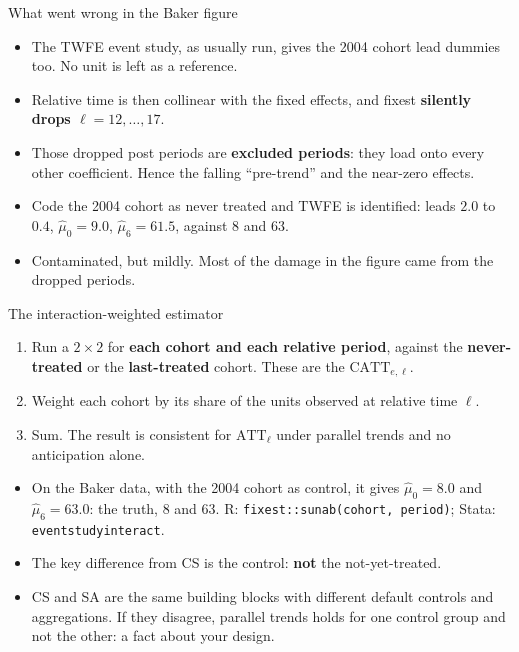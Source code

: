 \documentclass[
  11pt,
  ignorenonframetext,
  aspectratio=169,
]{beamer}
\providecommand{\tightlist}{%
  \setlength{\itemsep}{0pt}\setlength{\parskip}{0pt}}
\begin{document}
\begin{frame}{What went wrong in the Baker figure}
\protect{}\label{what-went-wrong-in-the-baker-figure}
\begin{itemize}
\tightlist
\item
  The TWFE event study, as usually run, gives the 2004 cohort lead
  dummies too. No unit is left as a reference.
\item
  Relative time is then collinear with the fixed effects, and fixest
  \textbf{silently drops \(\ell = 12, \dots, 17\)}.
\item
  Those dropped post periods are \textbf{excluded periods}: they load
  onto every other coefficient. Hence the falling ``pre-trend'' and the
  near-zero effects.
\end{itemize}

\vspace{0.4em}

\begin{itemize}
\tightlist
\item
  Code the 2004 cohort as never treated and TWFE is identified: leads
  \(2.0\) to \(0.4\), \(\hat\mu_0 = 9.0\), \(\hat\mu_{6} = 61.5\),
  against \(8\) and \(63\).
\item
  Contaminated, but mildly. Most of the damage in the figure came from
  the dropped periods.
\end{itemize}
\end{frame}

\begin{frame}[fragile]{The interaction-weighted estimator}
\protect{}\label{the-interaction-weighted-estimator}
\begin{enumerate}
\tightlist
\item
  Run a \(2 \times 2\) for \textbf{each cohort and each relative
  period}, against the \textbf{never-treated} or the
  \textbf{last-treated} cohort. These are the \(\text{CATT}_{e,\ell}\).
\item
  Weight each cohort by its share of the units observed at relative time
  \(\ell\).
\item
  Sum. The result is consistent for \(\text{ATT}_\ell\) under parallel
  trends and no anticipation alone.
\end{enumerate}

\vspace{0.3em}

\begin{itemize}
\tightlist
\item
  On the Baker data, with the 2004 cohort as control, it gives
  \(\hat\mu_0 = 8.0\) and \(\hat\mu_6 = 63.0\): the truth, \(8\) and
  \(63\). R: \texttt{fixest::sunab(cohort,\ period)}; Stata:
  \texttt{eventstudyinteract}.
\item
  The key difference from CS is the control: \textbf{not} the
  not-yet-treated.
\item
  CS and SA are the same building blocks with different default controls
  and aggregations. If they disagree, parallel trends holds for one
  control group and not the other: a fact about your design.
\end{itemize}
\end{frame}
\end{document}
